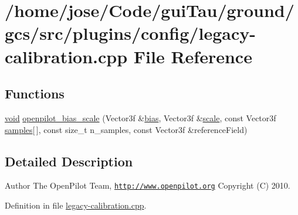 \hypertarget{legacy-calibration_8cpp}{\section{/home/jose/\-Code/gui\-Tau/ground/gcs/src/plugins/config/legacy-\/calibration.cpp File Reference}
\label{legacy-calibration_8cpp}
}
\subsection*{Functions}
\begin{DoxyCompactItemize}
\item 
\hyperlink{group___u_a_v_objects_plugin_ga444cf2ff3f0ecbe028adce838d373f5c}{void} \hyperlink{group___config_plugin_ga0b4a9c7b3d9017c7ddef423745b54f68}{openpilot\-\_\-bias\-\_\-scale} (Vector3f \&\hyperlink{glext_8h_a39c3ffa18f420251c5d132dd8c1c6137}{bias}, Vector3f \&\hyperlink{glext_8h_a281421b881aa7a1266842b73a3bc7655}{scale}, const Vector3f \hyperlink{glext_8h_aba70cd077c2c52c15358c231c6d293aa}{samples}\mbox{[}$\,$\mbox{]}, const size\-\_\-t n\-\_\-samples, const Vector3f \&reference\-Field)
\end{DoxyCompactItemize}


\subsection{Detailed Description}
\begin{DoxyAuthor}{Author}
The Open\-Pilot Team, \href{http://www.openpilot.org}{\tt http\-://www.\-openpilot.\-org} Copyright (C) 2010. 
\end{DoxyAuthor}


Definition in file \hyperlink{legacy-calibration_8cpp_source}{legacy-\/calibration.\-cpp}.

